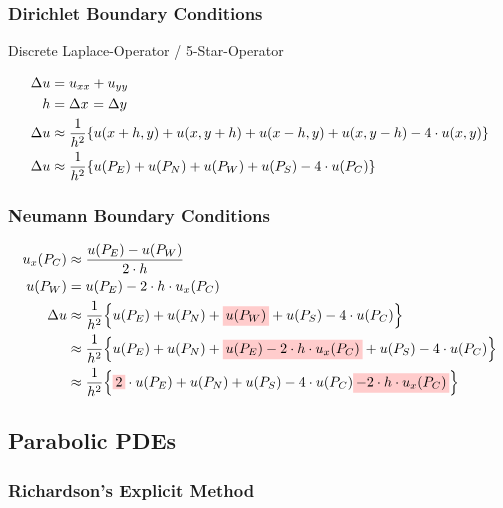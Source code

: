 \documentclass[
	final,
	a4paper,
	oneside,
	parskip=full,
	headings=standardclasses,
	headings=big,
	pointednumbers,
    fleqn
]{scrartcl}
\newcommand{\tfillr}[1]{\tfillc[#1][red!20]}
\newcommand{\f}[2]{\frac{#1}{#2}}
\newcommand{\kl}[1]{{\left( #1 \right)}}
\newcommand{\kq}[1]{{\left\{ #1 \right\}}}
\begin{document}
    \subsubsection*{Dirichlet Boundary Conditions}
    
    Discrete Laplace-Operator / 5-Star-Operator
    
    \begin{align*}
        \Delta u & = u_{xx} + u_{yy} \\
        h        & = \dx = \dy \\
        \Delta u & \approx \f{1}{h^2} \kq{u\kl{x + h, y} + u\kl{x, y + h} + u\kl{x - h, y} + u\kl{x, y - h} - 4 \cdot u\kl{x,y}} \\
        \Delta u & \approx \f{1}{h^2} \kq{u\kl{P_E} + u\kl{P_N} + u\kl{P_W} + u\kl{P_S} - 4 \cdot u\kl{P_C}}
    \end{align*}

    \subsubsection*{Neumann Boundary Conditions}

    \begin{align*}
        u_x\kl{P_C} & \approx \f{u\kl{P_E} - u\kl{P_W}}{2\cdot h} \\
        u\kl{P_W}   & = u\kl{P_E} - 2\cdot h \cdot u_x\kl{P_C} \\
        \Delta u    & \approx \f{1}{h^2} \kq{u\kl{P_E} + u\kl{P_N} + \tfillr{$u\kl{P_W}$} + u\kl{P_S} - 4 \cdot u\kl{P_C}} \\
                    & \approx \f{1}{h^2} \kq{u\kl{P_E} + u\kl{P_N} + \tfillr{$u\kl{P_E} - 2\cdot h \cdot u_x\kl{P_C}$} + u\kl{P_S} - 4 \cdot u\kl{P_C}} \\
                    & \approx \f{1}{h^2} \kq{\tfillr{$2$} \cdot u\kl{P_E} + u\kl{P_N} + u\kl{P_S} - 4 \cdot u\kl{P_C} \tfillr{$- 2\cdot h \cdot u_x\kl{P_C}$}} \\
    \end{align*}
    

    
    \newpage

    \subsection*{Parabolic PDEs}
    \subsubsection*{Richardson's Explicit Method}
\end{document}
